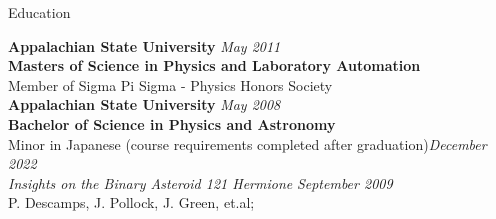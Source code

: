 \documentclass{cv} %
\begin{document}

\begin{rSection}{Education}
	
	{\bf Appalachian State University} \hfill {\em May 2011} \\ 
	{\bf Masters of Science in Physics and Laboratory Automation} \\
	Member of Sigma Pi Sigma - Physics Honors Society \\
	
	{\bf Appalachian State University} \hfill {\em May 2008} \\ 
	{\bf Bachelor of Science in Physics and Astronomy} \\
	Minor in Japanese (course requirements completed after graduation)\hfill{\em December 2022}\\
	{\em Insights on the Binary Asteroid 121 Hermione} \hfill {\em September 2009}\\ {P. Descamps, J. Pollock, J. Green, et.al;}	
\end{rSection}

\end{document}
